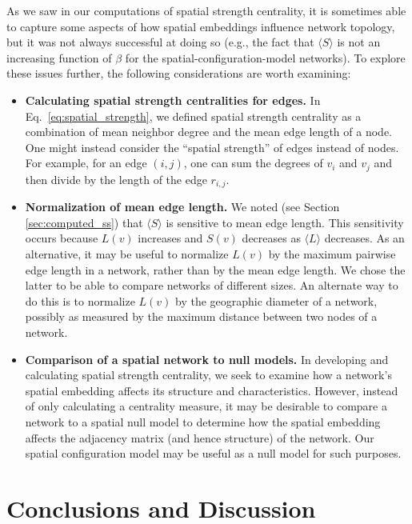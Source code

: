 \documentclass[%
 reprint,
 amsmath,amssymb,
 aps,
]{revtex4-1}
\begin{document}
As we saw in our computations of spatial strength centrality, it is sometimes able to capture some aspects of how spatial embeddings influence network topology, but it was not always successful at doing so (e.g., the fact that $\langle S \rangle$ is not an increasing function of $\beta$ for the spatial-configuration-model networks). To explore these issues further, the following considerations are worth examining:
\begin{itemize}
    \item{\textbf{Calculating spatial strength centralities for edges.} In Eq.~\eqref{eq:spatial_strength}, we defined spatial strength centrality as a combination of mean neighbor degree and the mean edge length of a node. One might instead consider the ``spatial strength'' of edges instead of nodes. For example, for an edge $(i, j)$, one can sum the degrees of $v_i$ and $v_j$ and then divide by the length of the edge $r_{i,j}$. }
    \item{\textbf{Normalization of mean edge length.} We noted (see Section \ref{sec:computed_ss}) that $\langle S \rangle$ is sensitive to mean edge length. This sensitivity occurs because $L(v)$ increases and $S(v)$ decreases as $\langle L \rangle$ decreases. 
  As an alternative, it may be useful to normalize $L(v)$ by the maximum pairwise edge length in a network, rather than by the mean edge length. We chose the latter to be able to compare networks of different sizes. An alternate way to do this is to normalize $L(v)$ by the geographic diameter of a network, possibly as measured by the maximum distance between two nodes of a network.}
    \item{\textbf{Comparison of a spatial network to null models.} In developing and calculating spatial strength centrality, we seek to examine how a network's spatial embedding affects its structure and characteristics. However, instead of only calculating a centrality measure, it may be desirable to compare a network to a spatial null model to determine how the spatial embedding affects the adjacency matrix (and hence structure) of the network. Our spatial configuration model may be useful as a null model for such purposes.}
\end{itemize}


\section{Conclusions and Discussion} \label{sec:discussion}
\end{document}
